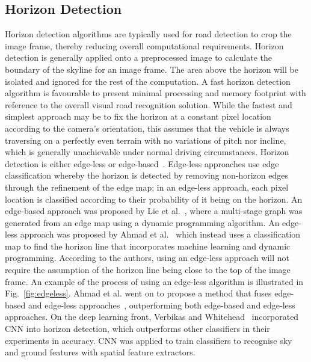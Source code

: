 \subsection{Horizon Detection} \label{sechorizon}
Horizon detection algorithms are typically used for road detection to crop the image frame, thereby reducing overall computational requirements. Horizon detection is generally applied onto a preprocessed image to calculate the boundary of the skyline for an image frame. The area above the horizon will be isolated and ignored for the rest of the computation. A fast horizon detection algorithm is favourable to present minimal processing and memory footprint with reference to the overall visual road recognition solution. While the fastest and simplest approach may be to fix the horizon at a constant pixel location according to the camera's orientation, this assumes that the vehicle is always traversing on a perfectly even terrain with no variations of pitch nor incline, which is generally unachievable under normal driving circumstances. Horizon detection is either edge-less or edge-based~\cite{t._ahmad_fusion_2015}. Edge-less approaches use edge classification whereby the horizon is detected by removing non-horizon edges through the refinement of the edge map; in an edge-less approach, each pixel location is classified according to their probability of it being on the horizon. An edge-based approach was proposed by Lie et al.~\cite{lie_robust_2005}, where a multi-stage graph was generated from an edge map using a dynamic programming algorithm. An edge-less approach was proposed by Ahmad et al.~\cite{t._ahmad_edge-less_2015} which instead uses a classification map to find the horizon line that incorporates machine learning and dynamic programming. According to the authors, using an edge-less approach will not require the assumption of the horizon line being close to the top of the image frame. An example of the process of using an edge-less algorithm is illustrated in Fig.~\ref{fig:edgeless}. Ahmad et al. went on to propose a method that fuses edge-based and edge-less approaches~\cite{t._ahmad_fusion_2015}, outperforming both edge-based and edge-less approaches. On the deep learning front, Verbikas and Whitehead~\cite{verbickas_sky_2014} incorporated CNN into horizon detection, which outperforms other classifiers in their experiments in accuracy. CNN was applied to train classifiers to recognise sky and ground features with spatial feature extractors.

